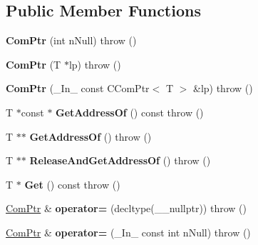 \subsection*{Public Member Functions}
\begin{DoxyCompactItemize}
\item 
\mbox{\label{class_com_ptr_aa7288a233982af16a02c3603d623722b}} 
{\bfseries Com\+Ptr} (int n\+Null)  throw ()
\item 
\mbox{\label{class_com_ptr_a0f6b09be3d7bd97cf0ef1602836ef407}} 
{\bfseries Com\+Ptr} (T $\ast$lp)  throw ()
\item 
\mbox{\label{class_com_ptr_acf02bee5e7893561d1e76571ed15c4a0}} 
{\bfseries Com\+Ptr} (\+\_\+\+In\+\_\+ const C\+Com\+Ptr$<$ T $>$ \&lp)  throw ()
\item 
\mbox{\label{class_com_ptr_aea2a932d8a1b7c29a3c95e45944f71ae}} 
T $\ast$const  $\ast$ {\bfseries Get\+Address\+Of} () const  throw ()
\item 
\mbox{\label{class_com_ptr_a28272224d77532c89e01b79ede9b1f88}} 
T $\ast$$\ast$ {\bfseries Get\+Address\+Of} ()  throw ()
\item 
\mbox{\label{class_com_ptr_a581b627af3d5dd19bfd92f7cddb84cd6}} 
T $\ast$$\ast$ {\bfseries Release\+And\+Get\+Address\+Of} ()  throw ()
\item 
\mbox{\label{class_com_ptr_a7d78b9b5bcb16e8735541e72dea5bda6}} 
T $\ast$ {\bfseries Get} () const  throw ()
\item 
\mbox{\label{class_com_ptr_ab1a49ffcc357e0c8cef0d1a311297f36}} 
\hyperlink{class_com_ptr}{Com\+Ptr} \& {\bfseries operator=} (decltype(\+\_\+\+\_\+nullptr))  throw ()
\item 
\mbox{\label{class_com_ptr_a9e713010596f661852ddb1b8114d476c}} 
\hyperlink{class_com_ptr}{Com\+Ptr} \& {\bfseries operator=} (\+\_\+\+In\+\_\+ const int n\+Null)  throw ()
\item 
\mbox{\label{class_com_ptr_aafabcea3c744d048b1e3728d17e09a85}} 

\end{DoxyCompactItemize}
